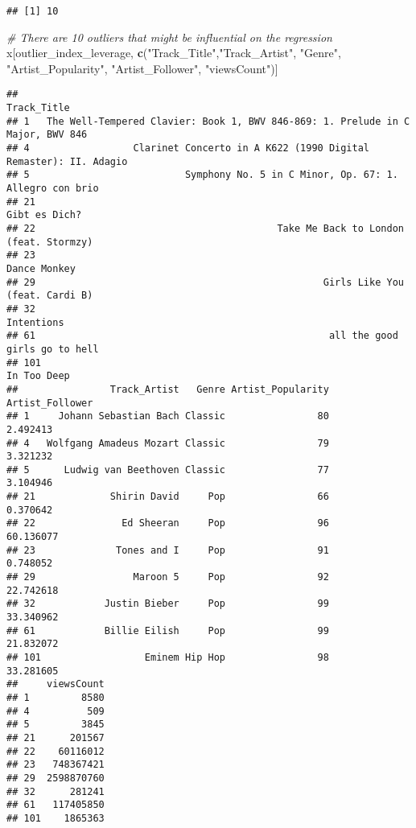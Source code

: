 \documentclass[
]{article}
\newenvironment{Shaded}{\begin{snugshade}}{\end{snugshade}}
\newcommand{\CommentTok}[1]{\textcolor[rgb]{0.56,0.35,0.01}{\textit{#1}}}
\newcommand{\KeywordTok}[1]{\textcolor[rgb]{0.13,0.29,0.53}{\textbf{#1}}}
\newcommand{\NormalTok}[1]{#1}
\newcommand{\StringTok}[1]{\textcolor[rgb]{0.31,0.60,0.02}{#1}}
\begin{document}
\begin{verbatim}
## [1] 10
\end{verbatim}

\begin{Shaded}
\begin{Highlighting}[]
\CommentTok{# There are 10 outliers that might be influential on the regression}
\NormalTok{x[outlier_index_leverage, }\KeywordTok{c}\NormalTok{(}\StringTok{"Track_Title"}\NormalTok{,}\StringTok{"Track_Artist"}\NormalTok{, }\StringTok{"Genre"}\NormalTok{, }\StringTok{"Artist_Popularity"}\NormalTok{, }\StringTok{"Artist_Follower"}\NormalTok{, }\StringTok{"viewsCount"}\NormalTok{)]}
\end{Highlighting}
\end{Shaded}

\begin{verbatim}
##                                                                        Track_Title
## 1   The Well-Tempered Clavier: Book 1, BWV 846-869: 1. Prelude in C Major, BWV 846
## 4                  Clarinet Concerto in A K622 (1990 Digital Remaster): II. Adagio
## 5                           Symphony No. 5 in C Minor, Op. 67: 1. Allegro con brio
## 21                                                                   Gibt es Dich?
## 22                                          Take Me Back to London (feat. Stormzy)
## 23                                                                    Dance Monkey
## 29                                                  Girls Like You (feat. Cardi B)
## 32                                                                      Intentions
## 61                                                   all the good girls go to hell
## 101                                                                    In Too Deep
##                Track_Artist   Genre Artist_Popularity Artist_Follower
## 1     Johann Sebastian Bach Classic                80        2.492413
## 4   Wolfgang Amadeus Mozart Classic                79        3.321232
## 5      Ludwig van Beethoven Classic                77        3.104946
## 21             Shirin David     Pop                66        0.370642
## 22               Ed Sheeran     Pop                96       60.136077
## 23              Tones and I     Pop                91        0.748052
## 29                 Maroon 5     Pop                92       22.742618
## 32            Justin Bieber     Pop                99       33.340962
## 61            Billie Eilish     Pop                99       21.832072
## 101                  Eminem Hip Hop                98       33.281605
##     viewsCount
## 1         8580
## 4          509
## 5         3845
## 21      201567
## 22    60116012
## 23   748367421
## 29  2598870760
## 32      281241
## 61   117405850
## 101    1865363
\end{verbatim}
\end{document}
